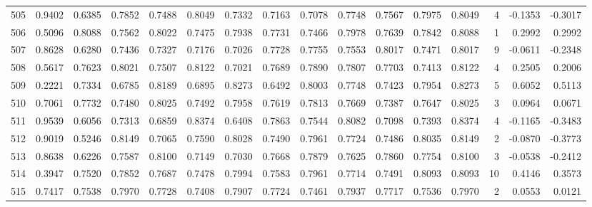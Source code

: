 \begin{tabular}{lrrrrrrrrrrrrrrr}
505 &      0.9402 &  0.6385 &  0.7852 &  0.7488 &  0.8049 &  0.7332 &  0.7163 &  0.7078 &  0.7748 &  0.7567 &   0.7975 &     0.8049 &      4 &                   -0.1353 &                    -0.3017 \\
506 &      0.5096 &  0.8088 &  0.7562 &  0.8022 &  0.7475 &  0.7938 &  0.7731 &  0.7466 &  0.7978 &  0.7639 &   0.7842 &     0.8088 &      1 &                    0.2992 &                     0.2992 \\
507 &      0.8628 &  0.6280 &  0.7436 &  0.7327 &  0.7176 &  0.7026 &  0.7728 &  0.7755 &  0.7553 &  0.8017 &   0.7471 &     0.8017 &      9 &                   -0.0611 &                    -0.2348 \\
508 &      0.5617 &  0.7623 &  0.8021 &  0.7507 &  0.8122 &  0.7021 &  0.7689 &  0.7890 &  0.7807 &  0.7703 &   0.7413 &     0.8122 &      4 &                    0.2505 &                     0.2006 \\
509 &      0.2221 &  0.7334 &  0.6785 &  0.8189 &  0.6895 &  0.8273 &  0.6492 &  0.8003 &  0.7748 &  0.7423 &   0.7954 &     0.8273 &      5 &                    0.6052 &                     0.5113 \\
510 &      0.7061 &  0.7732 &  0.7480 &  0.8025 &  0.7492 &  0.7958 &  0.7619 &  0.7813 &  0.7669 &  0.7387 &   0.7647 &     0.8025 &      3 &                    0.0964 &                     0.0671 \\
511 &      0.9539 &  0.6056 &  0.7313 &  0.6859 &  0.8374 &  0.6408 &  0.7863 &  0.7544 &  0.8082 &  0.7098 &   0.7393 &     0.8374 &      4 &                   -0.1165 &                    -0.3483 \\
512 &      0.9019 &  0.5246 &  0.8149 &  0.7065 &  0.7590 &  0.8028 &  0.7490 &  0.7961 &  0.7724 &  0.7486 &   0.8035 &     0.8149 &      2 &                   -0.0870 &                    -0.3773 \\
513 &      0.8638 &  0.6226 &  0.7587 &  0.8100 &  0.7149 &  0.7030 &  0.7668 &  0.7879 &  0.7625 &  0.7860 &   0.7754 &     0.8100 &      3 &                   -0.0538 &                    -0.2412 \\
514 &      0.3947 &  0.7520 &  0.7852 &  0.7687 &  0.7478 &  0.7994 &  0.7583 &  0.7961 &  0.7714 &  0.7491 &   0.8093 &     0.8093 &     10 &                    0.4146 &                     0.3573 \\
515 &      0.7417 &  0.7538 &  0.7970 &  0.7728 &  0.7408 &  0.7907 &  0.7724 &  0.7461 &  0.7937 &  0.7717 &   0.7536 &     0.7970 &      2 &                    0.0553 &                     0.0121 \\

\end{tabular}
